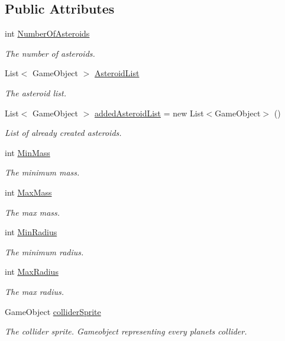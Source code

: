 \subsection*{Public Attributes}
\begin{DoxyCompactItemize}
\item 
int \mbox{\hyperlink{class_asteroid_generator_a4cc51b71a8eb59ad4fa0a58b1ab2fdbc}{Number\+Of\+Asteroids}}
\begin{DoxyCompactList}\small\item\em The number of asteroids. \end{DoxyCompactList}\item 
List$<$ Game\+Object $>$ \mbox{\hyperlink{class_asteroid_generator_a96adffc17fece791d1735c8ffd72cd43}{Asteroid\+List}}
\begin{DoxyCompactList}\small\item\em The asteroid list. \end{DoxyCompactList}\item 
List$<$ Game\+Object $>$ \mbox{\hyperlink{class_asteroid_generator_a3547304e3d1a3777f6d996e7f6c409de}{added\+Asteroid\+List}} = new List$<$Game\+Object$>$ ()
\begin{DoxyCompactList}\small\item\em List of already created asteroids. \end{DoxyCompactList}\item 
int \mbox{\hyperlink{class_asteroid_generator_ac4789385fb5a11f27cf743ddf1e32f93}{Min\+Mass}}
\begin{DoxyCompactList}\small\item\em The minimum mass. \end{DoxyCompactList}\item 
int \mbox{\hyperlink{class_asteroid_generator_aaa0eb57c660f14898c0c7b196293584a}{Max\+Mass}}
\begin{DoxyCompactList}\small\item\em The max mass. \end{DoxyCompactList}\item 
int \mbox{\hyperlink{class_asteroid_generator_a7bbc470dbc92203ced647f45cf557940}{Min\+Radius}}
\begin{DoxyCompactList}\small\item\em The minimum radius. \end{DoxyCompactList}\item 
int \mbox{\hyperlink{class_asteroid_generator_a5e008980325a1f5b6faa04a8b44fdc3e}{Max\+Radius}}
\begin{DoxyCompactList}\small\item\em The max radius. \end{DoxyCompactList}\item 
Game\+Object \mbox{\hyperlink{class_asteroid_generator_ab4e16ac73ae5fc15af5704ad3e6f8bc5}{collider\+Sprite}}
\begin{DoxyCompactList}\small\item\em The collider sprite. Gameobject representing every planet\textquotesingle{}s collider. \end{DoxyCompactList}\end{DoxyCompactItemize}
